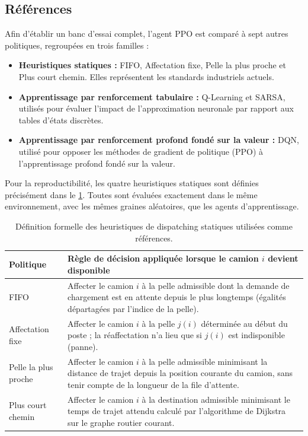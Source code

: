 \documentclass[11pt,a4paper]{article}
\begin{document}
\subsection{Références}

Afin d'établir un banc d'essai complet, l'agent PPO est comparé à sept autres politiques, regroupées en trois familles :

\begin{itemize}
  \item \textbf{Heuristiques statiques :} FIFO, Affectation fixe, Pelle la plus proche et Plus court chemin. Elles représentent les standards industriels actuels.
  \item \textbf{Apprentissage par renforcement tabulaire :} Q-Learning et SARSA, utilisés pour évaluer l'impact de l'approximation neuronale par rapport aux tables d'états discrètes.
  \item \textbf{Apprentissage par renforcement profond fondé sur la valeur :} DQN, utilisé pour opposer les méthodes de gradient de politique (PPO) à l'apprentissage profond fondé sur la valeur.
\end{itemize}

Pour la reproductibilité, les quatre heuristiques statiques sont définies précisément dans le \cref{tab:baselines}. Toutes sont évaluées exactement dans le même environnement, avec les mêmes graines aléatoires, que les agents d'apprentissage.

\begin{table}[H]
\centering
\caption{Définition formelle des heuristiques de dispatching statiques utilisées comme références.}
\label{tab:baselines}
\small
\begin{tabularx}{\textwidth}{lX}
\toprule
\textbf{Politique} & \textbf{Règle de décision appliquée lorsque le camion $i$ devient disponible} \\
\midrule
FIFO             & Affecter le camion $i$ à la pelle admissible dont la demande de chargement est en attente depuis le plus longtemps (égalités départagées par l'indice de la pelle). \\
Affectation fixe & Affecter le camion $i$ à la pelle $j(i)$ déterminée au début du poste ; la réaffectation n'a lieu que si $j(i)$ est indisponible (panne). \\
Pelle la plus proche & Affecter le camion $i$ à la pelle admissible minimisant la distance de trajet depuis la position courante du camion, sans tenir compte de la longueur de la file d'attente. \\
Plus court chemin & Affecter le camion $i$ à la destination admissible minimisant le temps de trajet attendu calculé par l'algorithme de Dijkstra sur le graphe routier courant. \\
\bottomrule
\end{tabularx}
\end{table}
\end{document}
